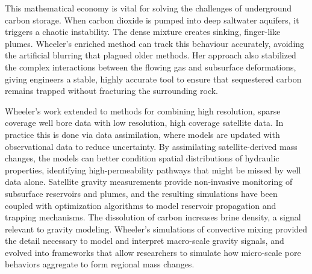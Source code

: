 This mathematical economy is vital for solving the challenges of underground carbon storage. When carbon dioxide is pumped into deep saltwater aquifers, it triggers a chaotic instability. The dense mixture creates sinking, finger-like plumes. Wheeler’s enriched method can track this behaviour accurately, avoiding the artificial blurring that plagued older methods. Her approach also stabilized the complex interactions between the flowing gas and subsurface deformations, giving engineers a stable, highly accurate tool to ensure that sequestered carbon remains trapped without fracturing the surrounding rock.

Wheeler’s work extended to methods for combining high resolution, sparse coverage well bore data with low resolution, high coverage satellite data. In practice this is done via data assimilation, where models are updated with observational data to reduce uncertainty. By assimilating satellite-derived mass changes, the models can better condition spatial distributions of hydraulic properties, identifying high-permeability pathways that might be missed by well data alone. Satellite gravity measurements provide non-invasive monitoring of subsurface reservoirs and plumes, and the resulting simulations have been coupled with optimization algorithms to model reservoir propagation and trapping mechanisms. The dissolution of carbon increases brine density, a signal relevant to gravity modeling. Wheeler’s simulations of convective mixing provided the detail necessary to model and interpret macro-scale gravity signals, and evolved into frameworks that allow researchers to simulate how micro-scale pore behaviors aggregate to form regional mass changes. 
